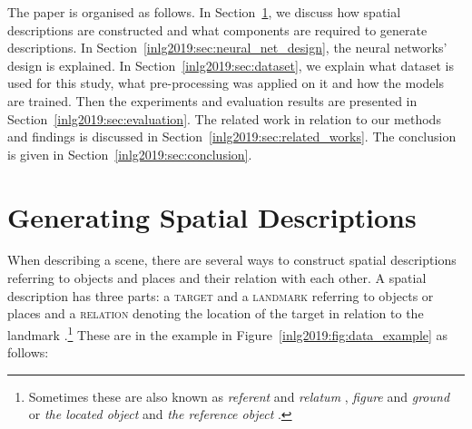 The paper is organised as follows.
In Section~\ref{inlg2019:sec:generating_locative_expressions}, we discuss how
spatial descriptions are constructed and what components are required
to generate descriptions. In Section~\ref{inlg2019:sec:neural_net_design}, the
neural networks' design is explained. In Section~\ref{inlg2019:sec:dataset}, we
explain what dataset is used for this study, what pre-processing
was applied on it and how the models are trained. Then the experiments and evaluation results are
presented in Section~\ref{inlg2019:sec:evaluation}. The related work in relation to our methods and findings is discussed %
in Section~\ref{inlg2019:sec:related_works}. %
The conclusion is
given in Section~\ref{inlg2019:sec:conclusion}.


\section{Generating Spatial Descriptions} %
\label{inlg2019:sec:generating_locative_expressions}

When describing a scene, there are several ways to construct spatial
descriptions referring to objects and places and their relation with
each other.  A spatial description has three parts: a \textsc{target}
and a \textsc{landmark} referring to objects or places and a
\textsc{relation} denoting the location of the target in relation to
the landmark \cite{logan1996computational}.\footnote{Sometimes these are also known as \emph{referent} and \emph{relatum} \cite{Miller-JohnsonLaird:1976}, \emph{figure} and \emph{ground} \cite{Talmy:1983} or \emph{the located object} and \emph{the reference object} \cite{herskovits1986language,Gapp:1994:BasicMeanings,Dobnik:2009dz}.} These are in the example in
Figure~\ref{inlg2019:fig:data_example} as follows:

